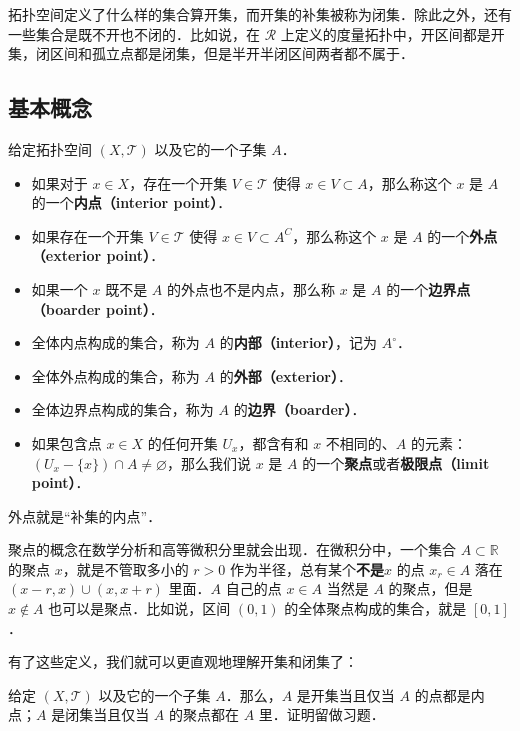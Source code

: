 
拓扑空间定义了什么样的集合算开集，而开集的补集被称为闭集．除此之外，还有一些集合是既不开也不闭的．比如说，在 $\mathcal{R}$ 上定义的度量拓扑中，开区间都是开集，闭区间和孤立点都是闭集，但是半开半闭区间两者都不属于．

\subsection{基本概念}
\begin{definition}{}\label{Topo0_def1}
给定拓扑空间 $(X, \mathcal{T})$ 以及它的一个子集 $A$．
\begin{itemize}
\item 如果对于 $x\in X$，存在一个开集 $V\in \mathcal{T}$ 使得 $x\in V\subset A$，那么称这个 $x$ 是 $A$ 的一个\textbf{内点（interior point）}．
\item 如果存在一个开集 $V\in \mathcal{T}$ 使得 $x\in V\subset A^C$，那么称这个 $x$ 是 $A$ 的一个\textbf{外点（exterior point）}．
\item 如果一个 $x$ 既不是 $A$ 的外点也不是内点，那么称 $x$ 是 $A$ 的一个\textbf{边界点（boarder point）}．

\item 全体内点构成的集合，称为 $A$ 的\textbf{内部（interior）}，记为 $A^\circ$．
\item 全体外点构成的集合，称为 $A$ 的\textbf{外部（exterior）}．
\item 全体边界点构成的集合，称为 $A$ 的\textbf{边界（boarder）}．
\item 如果包含点 $x\in X$ 的任何开集 $U_x$，都含有和 $x$ 不相同的、$A$ 的元素：$(U_x-\{x\})\cap A\not=\varnothing$，那么我们说 $x$ 是 $A$ 的一个\textbf{聚点}或者\textbf{极限点（limit point）}．
\end{itemize}
\end{definition}

外点就是“补集的内点”．

聚点的概念在数学分析和高等微积分里就会出现．在微积分中，一个集合 $A\subset\mathbb{R}$ 的聚点 $x$，就是不管取多小的 $r>0$ 作为半径，总有某个\textbf{不是}$x$ 的点 $x_r\in A$ 落在 $(x-r, x)\cup(x, x+r)$ 里面．$A$ 自己的点 $x\in A$ 当然是 $A$ 的聚点，但是 $x\not\in A$ 也可以是聚点．比如说，区间 $(0,1)$ 的全体聚点构成的集合，就是 $[0,1]$．

有了这些定义，我们就可以更直观地理解开集和闭集了：

\begin{exercise}{}\label{Topo0_exe1}
给定 $(X, \mathcal{T})$ 以及它的一个子集 $A$．那么，$A$ 是开集当且仅当 $A$ 的点都是内点；$A$ 是闭集当且仅当 $A$ 的聚点都在 $A$ 里．证明留做习题．
\end{exercise}

